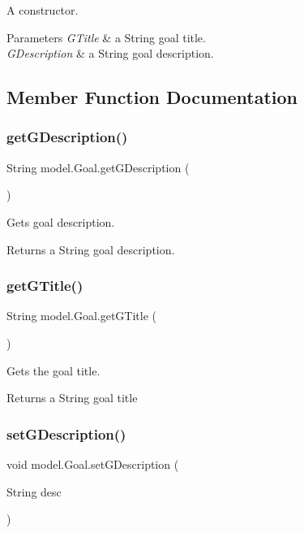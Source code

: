 A constructor. 
\begin{DoxyParams}{Parameters}
{\em G\+Title} & a String goal title. \\
\hline
{\em G\+Description} & a String goal description. \\
\hline
\end{DoxyParams}


\subsection{Member Function Documentation}
\mbox{\label{classmodel_1_1_goal_a3630e85712196a7e9632e41aca3e10d4}} 
\subsubsection{get\+G\+Description()}
{\footnotesize\ttfamily String model.\+Goal.\+get\+G\+Description (\begin{DoxyParamCaption}{ }\end{DoxyParamCaption})}

Gets goal description. \begin{DoxyReturn}{Returns}
a String goal description. 
\end{DoxyReturn}
\mbox{\label{classmodel_1_1_goal_a0caa8caa2fa97341171f65c04f887ab5}} 
\subsubsection{get\+G\+Title()}
{\footnotesize\ttfamily String model.\+Goal.\+get\+G\+Title (\begin{DoxyParamCaption}{ }\end{DoxyParamCaption})}

Gets the goal title. \begin{DoxyReturn}{Returns}
a String goal title 
\end{DoxyReturn}
\mbox{\label{classmodel_1_1_goal_a4c3803a3d9e48b6ad7495ed06d3578b4}} 
\subsubsection{set\+G\+Description()}
{\footnotesize\ttfamily void model.\+Goal.\+set\+G\+Description (\begin{DoxyParamCaption}\item[{String}]{desc }\end{DoxyParamCaption})\hspace{0.3cm}{\ttfamily [private]}}

